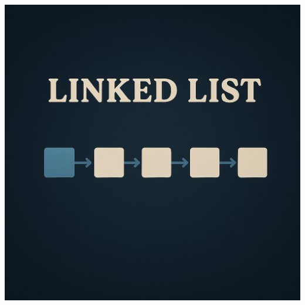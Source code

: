 \documentclass[a4paper,10pt]{book}
\begin{document}
\vspace{50mm}

\begin{center}
\includegraphics[height=13.88cm, width=17cm, keepaspectratio]{Pics/linkedlist.png}
\end{center}
\end{document}
